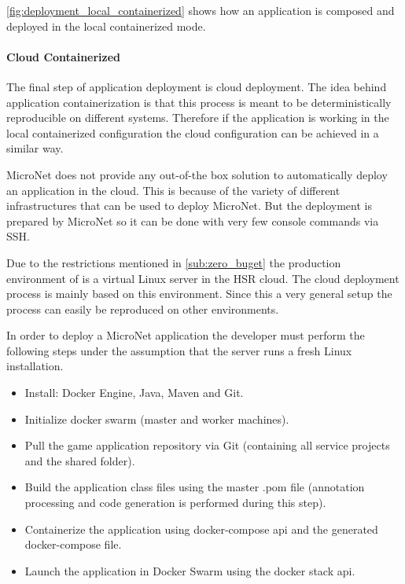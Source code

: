 \autoref{fig:deployment_local_containerized} shows how an application is
composed and deployed in the local containerized mode.

\paragraph{Cloud Containerized}

The final step of \ms{} application deployment is cloud deployment. The idea
behind application containerization is that this process is meant to be
deterministically reproducible on different systems. Therefore if the
application is working in the local containerized configuration the cloud
configuration can be achieved in a similar way.

MicroNet does not provide any out-of-the box solution to automatically deploy an
application in the cloud. This is because of the variety of
different infrastructures that can be used to deploy MicroNet. But the
deployment is prepared by MicroNet so it can be done with very few console
commands via SSH.

Due to the restrictions mentioned in \autoref{sub:zero_buget} the production
environment of \mn{} is a virtual Linux server in the HSR cloud. The cloud
deployment process is mainly based on this environment. Since this a very
general setup the process can easily be reproduced on other environments.

In order to deploy a MicroNet \ms{} application the developer must perform the
following steps under the assumption that the server runs a fresh Linux
installation.

\begin{itemize}
  \item Install: Docker Engine, Java, Maven and Git.
  \item Initialize docker swarm (master and worker machines).
  \item Pull the game application repository via Git (containing all service
  projects and the shared folder).
  \item Build the application class files using the master .pom file (annotation
  processing and code generation is performed during this step).
  \item Containerize the application using docker-compose \gls{api} and the generated
  docker-compose file.
  \item Launch the application in Docker Swarm using the docker stack \gls{api}.
\end{itemize}

